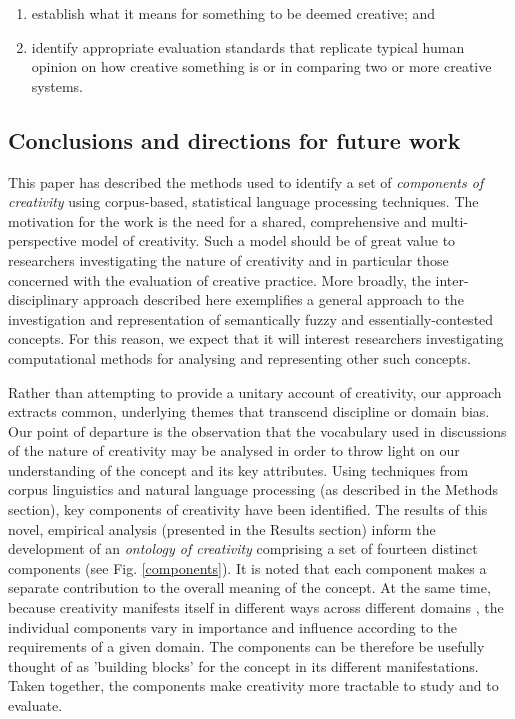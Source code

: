 \documentclass[10pt,letterpaper]{article}
\begin{document}
\begin{enumerate}
\item establish what it means for something to be deemed creative; and
\item identify appropriate evaluation standards that replicate typical human opinion on how creative something is or in comparing two or more creative systems.
\end{enumerate}




\subsection*{Conclusions and directions for future work}
\label{conclusions}


This paper has described the methods used to identify a set of {\em components of creativity} using corpus-based, statistical language processing techniques. The motivation for the work is the need for a shared, comprehensive and multi-perspective model of creativity. Such a model should be of great value to researchers investigating the nature of creativity and in particular those concerned with the evaluation of creative practice. More broadly, the inter-disciplinary approach described here exemplifies a general approach to the investigation and representation of semantically fuzzy and essentially-contested concepts. For this reason, we expect that it will interest researchers investigating computational methods for analysing and representing other such concepts.


Rather than attempting to provide a unitary account of creativity, our approach extracts common, underlying themes that transcend discipline or domain bias. Our point of departure is the observation that the vocabulary used in discussions of the nature of creativity may be analysed in order to throw light on our understanding of the concept and its key attributes. Using techniques from corpus linguistics and natural language processing (as described in the Methods section), key components of creativity have been identified. The results of this novel, empirical analysis (presented in the Results section) inform the development of an {\em ontology of creativity\/} comprising a set of fourteen distinct components (see Fig. \ref{components}).
It is noted that each component makes a separate contribution to the overall meaning of the concept. At the same time, because creativity manifests itself in different ways across different domains \cite{plucker04}, the individual components vary in importance and influence according to the requirements of a given domain. The components can be therefore be usefully thought of as 'building blocks' for the concept in its different manifestations. Taken together, the components make creativity more tractable to study and to evaluate. 
\end{document}
